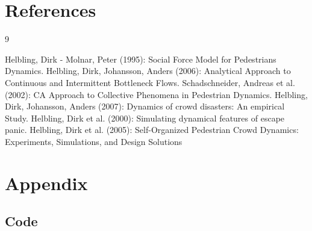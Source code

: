\documentclass[11pt]{article}
\begin{document}
\section{References}

\begin{thebibliography} {9}
	
	 Helbling, Dirk - Molnar, Peter (1995): Social Force Model for Pedestrians Dynamics.
	 Helbling, Dirk, Johansson, Anders (2006): Analytical Approach to Continuous and Intermittent Bottleneck Flows.
	 Schadschneider, Andreas et al. (2002): CA Approach to Collective Phenomena in Pedestrian Dynamics.	
	 Helbling, Dirk, Johansson, Anders (2007): Dynamics of crowd disasters: An empirical Study.
	 Helbling, Dirk et al. (2000): Simulating dynamical features of escape panic.
	 Helbling, Dirk et al. (2005): Self-Organized Pedestrian Crowd Dynamics: Experiments, Simulations, and Design Solutions

\end{thebibliography}


\section{Appendix}

\subsection{Code}

\lstset{language=Matlab,breaklines=true}


















\end{document}
